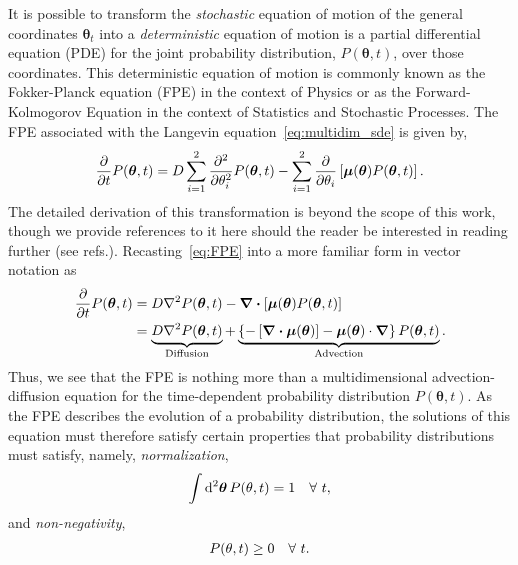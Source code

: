 \documentclass[10pt]{article}
\begin{document}
It is possible to transform the \emph{stochastic} equation of motion of the general coordinates $\bm{\theta}_{t}$ into a \emph{deterministic} equation of motion is a partial differential equation (PDE) for the joint probability distribution, $P(\bm{\theta},t)$, over those coordinates. This deterministic equation of motion is commonly known as the Fokker-Planck equation (FPE) in the context of Physics or as the Forward-Kolmogorov Equation in the context of Statistics and Stochastic Processes. The FPE associated with the Langevin equation~\eqref{eq:multidim_sde} is given by,
\begin{align}
    \frac{\partial}{\partial t} P(\bm{\theta}, t) =  D\sum_{i=1}^{2}\pdv[2]{}{\theta_{i}} P(\bm{\theta}, t) -\sum_{i=1}^{2}\pdv{}{\theta_{i}}\left[\bm{\mu}(\bm{\theta})P(\bm{\theta}, t)\right]. \label{eq:FPE}
\end{align}
The detailed derivation of this transformation is beyond the scope of this work, though we provide references to it here should the reader be interested in reading further (see refs.). 
Recasting~\eqref{eq:FPE} into a more familiar form in vector notation as 
\begin{subequations}
     \label{eq:FPE_vec}
    \begin{align}
        \frac{\partial}{\partial t} P(\bm{\theta}, t) &=  D\laplacian{P(\bm{\theta},t)} -\div{\left[\bm{\mu}(\bm{\theta})P(\bm{\theta},t)\right]} \\
        &= \underbrace{D\laplacian{{P(\bm{\theta},t)}}}_{\text{Diffusion}} +  \underbrace{\left\{-\left[\div{\bm{\mu}(\bm{\theta})}\right] - \bm{\mu}(\bm{\theta})\cdot\grad\right\}{P(\bm{\theta},t)}}_{\text{Advection}}.
    \end{align}
\end{subequations}
Thus, we see that the FPE is nothing more than a multidimensional advection-diffusion equation for the time-dependent probability distribution $P(\bm{\theta},t)$. As the FPE describes the evolution of a probability distribution, the solutions of this equation must therefore satisfy certain properties that probability distributions must satisfy, namely, \emph{normalization},
\begin{align}
    \int\dd[2]{\bm{\theta}} P(\vb{\theta},t) = 1\quad\forall\ t,\label{eq:prob_norm}
\end{align}
and \emph{non-negativity},
\begin{align}
    P(\vb{\theta},t) \ge 0\quad\forall\ t.\label{eq:nonnegativity}
\end{align}
\end{document}
